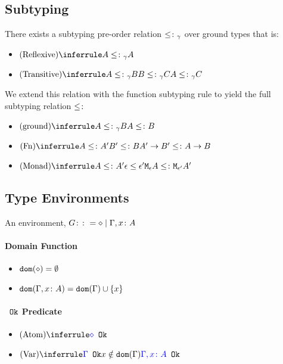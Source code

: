 \documentclass{report}
\begin{document}
\subsection{Subtyping}
    There exists a subtyping pre-order relation $\leq\colon_{\gamma}$ over ground types that is:
    \begin{itemize}
        \item $\ntreerulez{Reflexive}{A \subtype_{\ground} A}$
        \item $\ntreeruleII{Transitive}{A \subtype_{\ground} B }{ B \subtype_{\ground} C}{A \subtype_{\ground} C}$
    \end{itemize}

    We extend this relation with the function subtyping rule to yield the full subtyping relation $\leq\colon$

    \begin{itemize}
        \item $\ntreeruleI{ground}{A \subtype_{\ground} B}{A \subtype B}$
        \item $\ntreeruleII{Fn}{A \subtype A' }{ B' \subtype B }{\fntype{A'}{B'} \subtype \ab}$
        \item $\ntreeruleII{Monad}{A\subtype A'}{\e\subeffect\e'}{\mea\subtype\M{\e'}{A'}}$
    \end{itemize}
\subsection{Type Environments}
An environment, $G \colon\colon= \diamond \mid \Gamma, x\colon A$ 
\paragraph{Domain Function}
\begin{itemize}
    \item $\texttt{dom}(\diamond) = \emptyset$
    \item $\texttt{dom}(\Gamma, x\colon A) =  \texttt{dom}(\Gamma)  \cup \left\{x \right\}$
\end{itemize}
\paragraph{${\color{blue} } \texttt{ Ok}$ Predicate}
\begin{itemize}
    \item $\ntreerulez{Atom}{\ok{\nil}}$
    \item $\ntreeruleI{Var}{\ok{\G} }{ x\notin \dom{\G}}{\ok{\gax}}$
\end{itemize}
\end{document}
